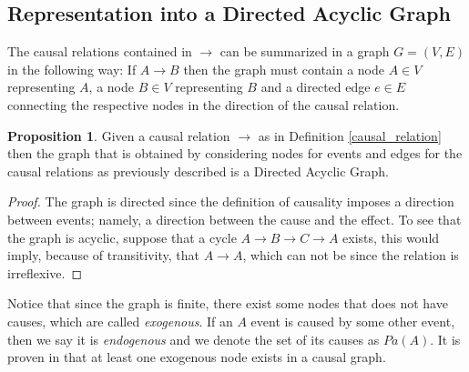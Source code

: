 \documentclass[english,letterpaper,12pt,final]{article}
\theoremstyle{definition}
\newtheorem{prop}{Proposition}[section]
\begin{document}
	\subsection{Representation into a Directed Acyclic Graph}
	The causal relations contained in $\to$ can be summarized in a graph $G=(V,E)$ in the following way: If $A \to B$ then the graph must contain a node $A \in V$ representing $A$, a node  $B \in V$ representing $B$ and a directed edge $e \in E$ connecting the respective nodes in the direction of the causal relation.
	\begin{prop}
	Given a causal relation $\to$ as in Definition \ref{causal_relation} then the graph that is obtained by considering nodes for events and edges for the causal relations as previously described is a Directed Acyclic Graph.
	\end{prop}
	\begin{proof}
	The graph is directed since the definition of causality imposes a direction between events; namely, a direction between the cause and the effect. To see that the graph is acyclic, suppose that a cycle $A \to B \to C \to A$ exists, this would imply, because of transitivity, that $A \to A$, which can not be since the relation is irreflexive.
	\end{proof}
	Notice that since the graph is finite, there exist some nodes that does not have causes, which are called \textit{exogenous}. If an $A$ event is caused by some other event, then we say it is \textit{endogenous} and we denote the set of its causes as $Pa(A)$. It is proven in \cite{kiiveri1984recursive} that at least one exogenous node exists in a causal graph.
\end{document}
